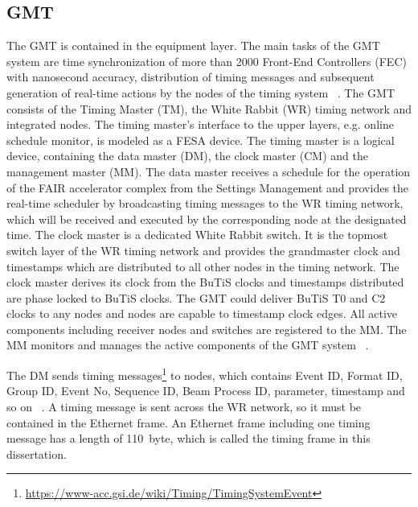 \subsection{GMT}
The GMT is contained in the equipment layer. The main tasks of the GMT system are time synchronization of more than 2000 Front-End Controllers (\gls{FEC}) with nanosecond accuracy, distribution of timing messages and subsequent generation of real-time actions by the nodes of the timing system ~\cite{beck_new_2012}. The GMT consists of the Timing Master (\gls{TM}), the White Rabbit (WR) timing network and integrated nodes. The timing master's interface to the upper layers, e.g. online schedule monitor, is modeled as a FESA device. The timing master is a logical device, containing the data master (\gls{DM}), the clock master (\gls{CM}) and the management master (\gls{MM}). The data master receives a schedule for the operation of the FAIR accelerator complex from the Settings Management and provides the real-time scheduler by broadcasting timing messages to the WR timing network, which will be received and executed by the corresponding node at the designated time. The clock master is a dedicated White Rabbit switch. It is the topmost switch layer of the WR timing network and provides the grandmaster clock and timestamps which are distributed to all other nodes in the timing network. The clock master derives its clock from the BuTiS clocks and timestamps distributed are phase locked to BuTiS clocks. The GMT could deliver BuTiS T0 and C2 clocks to any nodes and nodes are capable to timestamp clock edges. All active components including receiver nodes and switches are registered to the MM. The MM monitors and manages the active components of the GMT system ~\cite{beck_general_????}.

The DM sends timing messages\footnote{\url{https://www-acc.gsi.de/wiki/Timing/TimingSystemEvent}} to nodes, which contains Event ID, Format ID, Group ID, Event No, Sequence ID, Beam Process ID, parameter, timestamp and so on ~\cite{beck_timing_2015}. A timing message is sent across the WR network, so it must be contained in the Ethernet frame. An Ethernet frame including one timing message has a length of \SI{110}{byte}, which is called the timing frame in this dissertation.

